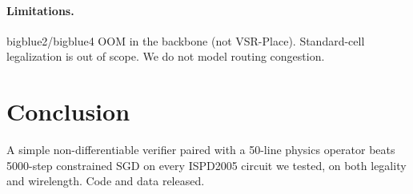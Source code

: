 \documentclass[conference]{IEEEtran}
\begin{document}
\paragraph{Limitations.} bigblue2/bigblue4 OOM in the backbone (not VSR-Place). Standard-cell legalization is out of scope. We do not model routing congestion.

\section{Conclusion}
A simple non-differentiable verifier paired with a 50-line physics operator beats 5000-step constrained SGD on every ISPD2005 circuit we tested, on both legality and wirelength. Code and data released.



\end{document}

